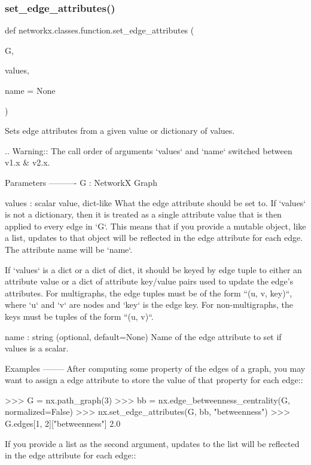\subsubsection{\texorpdfstring{set\+\_\+edge\+\_\+attributes()}{set\_edge\_attributes()}}
{\footnotesize\ttfamily def networkx.\+classes.\+function.\+set\+\_\+edge\+\_\+attributes (\begin{DoxyParamCaption}\item[{}]{G,  }\item[{}]{values,  }\item[{}]{name = {\ttfamily None} }\end{DoxyParamCaption})}

\begin{DoxyVerb}Sets edge attributes from a given value or dictionary of values.

.. Warning:: The call order of arguments `values` and `name`
    switched between v1.x & v2.x.

Parameters
----------
G : NetworkX Graph

values : scalar value, dict-like
    What the edge attribute should be set to.  If `values` is
    not a dictionary, then it is treated as a single attribute value
    that is then applied to every edge in `G`.  This means that if
    you provide a mutable object, like a list, updates to that object
    will be reflected in the edge attribute for each edge.  The attribute
    name will be `name`.

    If `values` is a dict or a dict of dict, it should be keyed
    by edge tuple to either an attribute value or a dict of attribute
    key/value pairs used to update the edge's attributes.
    For multigraphs, the edge tuples must be of the form ``(u, v, key)``,
    where `u` and `v` are nodes and `key` is the edge key.
    For non-multigraphs, the keys must be tuples of the form ``(u, v)``.

name : string (optional, default=None)
    Name of the edge attribute to set if values is a scalar.

Examples
--------
After computing some property of the edges of a graph, you may want
to assign a edge attribute to store the value of that property for
each edge::

    >>> G = nx.path_graph(3)
    >>> bb = nx.edge_betweenness_centrality(G, normalized=False)
    >>> nx.set_edge_attributes(G, bb, "betweenness")
    >>> G.edges[1, 2]["betweenness"]
    2.0

If you provide a list as the second argument, updates to the list
will be reflected in the edge attribute for each edge::


\end{DoxyVerb}
